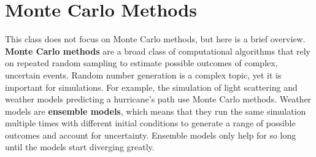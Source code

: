 \section{Monte Carlo Methods}

This class does not focus on Monte Carlo methods, but here is a brief overview. \textbf{Monte Carlo methods} are a broad class of computational algorithms that rely on repeated random sampling to estimate possible outcomes of complex, uncertain events. Random number generation is a complex topic, yet it is important for simulations. For example, the simulation of light scattering and weather models predicting a hurricane's path use Monte Carlo methods. Weather models are \textbf{ensemble models}, which means that they run the same simulation multiple times with different initial conditions to generate a range of possible outcomes and account for uncertainty. Ensemble models only help for so long until the models start diverging greatly.